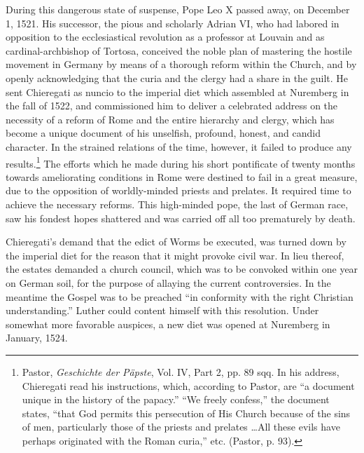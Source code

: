During this dangerous state of suspense, Pope Leo X passed away,
on December 1, 1521. His successor, the pious and scholarly Adrian
VI, who had labored in opposition to the ecclesiastical revolution as
a professor at Louvain and as cardinal-archbishop of Tortosa, conceived
the noble plan of mastering the hostile movement in Germany
by means of a thorough reform within the Church, and by openly
acknowledging that the curia and the clergy had a share in the guilt.
He sent Chieregati as nuncio to the imperial diet which assembled at
Nuremberg in the fall of 1522, and commissioned him to deliver
a celebrated address on the necessity of a reform of Rome and the
entire hierarchy and clergy, which has become a unique document of
his unselfish, profound, honest, and candid character. In the strained
relations of the time, however, it failed to produce any results.\footnote
{Pastor, \textit{Geschichte der Päpste}, Vol. IV, Part 2, pp. 89 sqq. In his address, Chieregati
read his instructions, which, according to Pastor, are “a document unique in the history
of the papacy.” “We freely confess,” the document states, “that God permits this persecution
of His Church because of the sins of men, particularly those of the priests and prelates \dots All
these evils have perhaps originated with the Roman curia,” etc. (Pastor,
p. 93).}
The efforts which he made during his short pontificate of twenty months
towards ameliorating conditions in Rome were destined to fail in a
great measure, due to the opposition of worldly-minded priests and
prelates. It required time to achieve the necessary reforms. This high-minded
pope, the last of German race, saw his fondest hopes shattered
and was carried off all too prematurely by death.

Chieregati’s demand that the edict of Worms be executed, was
turned down by the imperial diet for the reason that it might provoke civil
war. In lieu thereof, the estates demanded a church council,
which was to be convoked within one year on German soil, for the
purpose of allaying the current controversies. In the meantime the
Gospel was to be preached “in conformity with the right Christian
understanding.” Luther could content himself with this resolution.
Under somewhat more favorable auspices, a new diet was opened
at Nuremberg in January, 1524.

